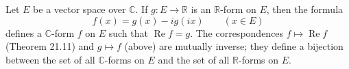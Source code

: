 Let $E$ be a vector space over $\mathbb{C}$. If $g: E \to \mathbb{R}$ is an $\mathbb{R}$-form on $E$, then the formula
$$f(x) = g(x) - i g(ix) \qquad (x \in E)$$
defines a $\mathbb{C}$-form $f$ on $E$ such that $\operatorname{Re} f = g$. The correspondences $f \mapsto \operatorname{Re} f$ (Theorem 21.11) and $g \mapsto f$ (above) are mutually inverse; they define a bijection between the set of all $\mathbb{C}$-forms on $E$ and the set of all $\mathbb{R}$-forms on $E$.
